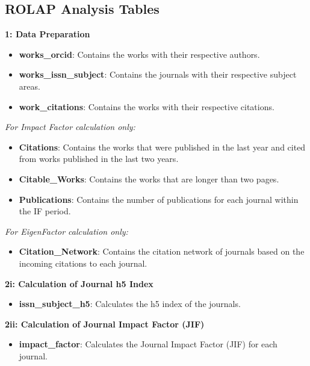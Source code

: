 \subsection{ROLAP Analysis Tables}

\noindent\textbf{1: Data Preparation}
\begin{itemize}
      \item \textbf{works\_orcid}: Contains the works with their respective authors.
      \item \textbf{works\_issn\_subject}: Contains the journals with their respective subject areas.
      \item \textbf{work\_citations}: Contains the works with their respective citations.
\end{itemize}

\vspace{0.5em} %
\noindent\emph{For Impact Factor calculation only:}
\begin{itemize}
      \item \textbf{Citations}: Contains the works that were published in the last year and cited from works published in the last two years.
      \item \textbf{Citable\_Works}: Contains the works that are longer than two pages.
      \item \textbf{Publications}: Contains the number of publications for each journal within the IF period.
\end{itemize}

\vspace{0.5em} %
\noindent\emph{For EigenFactor calculation only:}
\begin{itemize}
      \item \textbf{Citation\_Network}: Contains the citation network of journals based on the incoming citations to each journal.
\end{itemize}

\noindent\textbf{2i: Calculation of Journal h5 Index}
\begin{itemize}
      \item \textbf{issn\_subject\_h5}: Calculates the h5 index of the journals.
\end{itemize}

\noindent\textbf{2ii: Calculation of Journal Impact Factor (JIF)}
\begin{itemize}
      \item \textbf{impact\_factor}: Calculates the Journal Impact Factor (JIF) for each journal.
\end{itemize}


